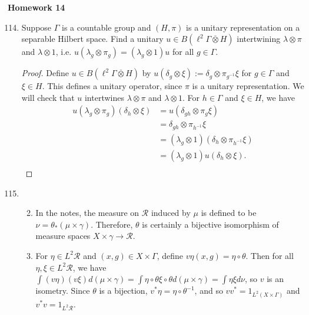 \documentclass[a4paper,10pt]{report}
\newcommand{\ol}[1]{\overline{#1}}
\begin{document}

\pagestyle{fancy}	
\fancyhf{} %
\setlength{\headheight}{60pt}

\begin{center}
	\textbf{Homework 14}
\end{center}
\begin{enumerate}
		\setcounter{enumi}{113}
	\item Suppose $\Gamma$ is a countable group and $(H, \pi)$ is a unitary representation
		on a separable Hilbert space.
		Find a unitary $u \in B(\ell^2\Gamma \ol{\otimes} H)$ intertwining $\lambda \otimes \pi$
		and $\lambda \otimes 1$, i.e. $u(\lambda_g \otimes \pi_g) = (\lambda_g \otimes 1)u$
		for all $g \in \Gamma$.
		\begin{proof}
			Define $u \in B(\ell^2\Gamma \ol{\otimes} H)$ by
			$u(\delta_g \otimes \xi) := \delta_g \otimes \pi_{g^{-1}}\xi$
			for $g \in \Gamma$ and $\xi \in H$.
			This defines a unitary operator, since $\pi$ is a unitary representation.
			We will check that $u$ intertwines $\lambda \otimes \pi$ and $\lambda \otimes 1$.
			For $h \in \Gamma$ and $\xi \in H$, we have
			\begin{align*}
				u(\lambda_g \otimes \pi_g)(\delta_h \otimes \xi)
				 & = u(\delta_{gh} \otimes \pi_g\xi) \\
				 & = \delta_{gh} \otimes \pi_{h^{-1}}\xi \\
				 & = (\lambda_g \otimes 1)(\delta_h \otimes \pi_{h^{-1}}\xi) \\
				 & = (\lambda_g \otimes 1)u(\delta_h \otimes \xi). \\
			\end{align*}
		\end{proof}
	\item 
		\begin{enumerate}
				\setcounter{enumi}{1}
			\item In the notes, the measure on $\mathcal{R}$ induced by $\mu$ is defined to be $\nu=\theta_*(\mu\times\gamma)$. Therefore, $\theta$ is certainly a bijective isomorphism of measure spaces $X\times\gamma\to\mathcal{R}$. 
				\setcounter{enumi}{0}
			\item For $\eta\in L^2\mathcal{R}$ and $(x,g)\in X\times\Gamma$, define $v\eta(x,g)=\eta\circ\theta$. Then for all $\eta,\xi\in L^2\mathcal{R}$, we have $\int(v\eta)(v\xi)d(\mu\times\gamma)=\int\eta\circ\theta\xi\circ\theta d(\mu\times\gamma)=\int\eta\xi d\nu$, so $v$ is an isometry. Since $\theta$ is a bijection, $v^*\eta=\eta\circ\theta^{-1}$, and so $vv^*=1_{L^2(X\times\Gamma)}$ and $v^*v=1_{L^2\mathcal{R}}$. 

\end{enumerate}
\end{enumerate}
\end{document}
